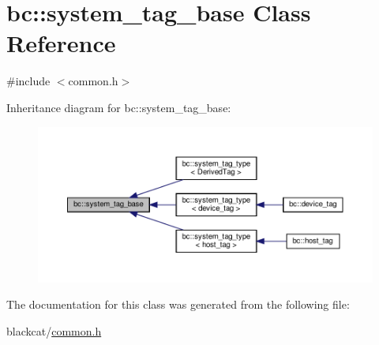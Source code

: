 \hypertarget{classbc_1_1system__tag__base}{}\section{bc\+:\+:system\+\_\+tag\+\_\+base Class Reference}
\label{classbc_1_1system__tag__base}


{\ttfamily \#include $<$common.\+h$>$}



Inheritance diagram for bc\+:\+:system\+\_\+tag\+\_\+base\+:\nopagebreak
\begin{figure}[H]
\begin{center}
\leavevmode
\includegraphics[width=350pt]{classbc_1_1system__tag__base__inherit__graph}
\end{center}
\end{figure}


The documentation for this class was generated from the following file\+:\begin{DoxyCompactItemize}
\item 
blackcat/\hyperlink{common_8h}{common.\+h}\end{DoxyCompactItemize}
